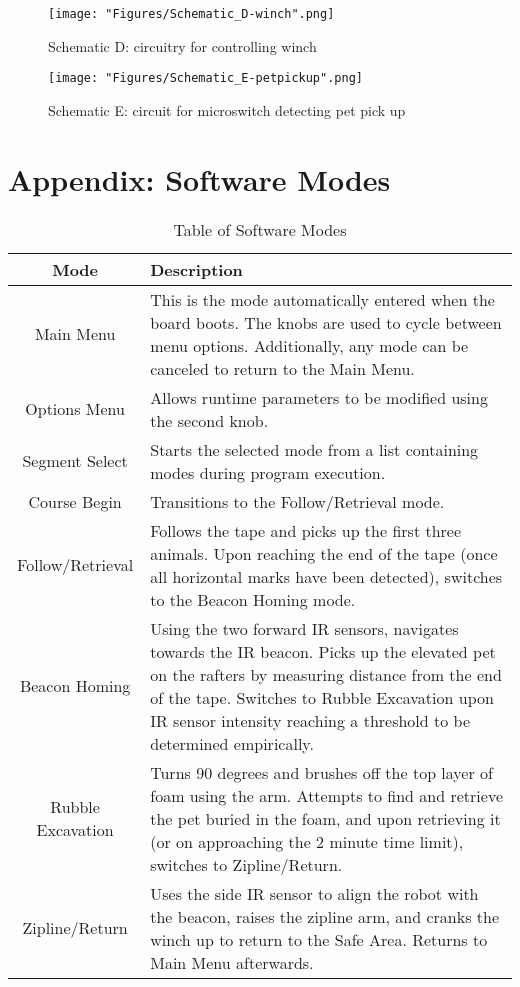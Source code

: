 \newpage
\begin{figure}[ht]
	\centering
	\texttt{[image: "Figures/Schematic\_D-winch".png]}
	\caption*{Schematic D: circuitry for controlling winch}
	\label{sch:D}
\end{figure}

\begin{figure}[ht]
	\centering
	\texttt{[image: "Figures/Schematic\_E-petpickup".png]}
	\caption*{Schematic E: circuit for microswitch detecting pet pick up}
	\label{sch:E}
\end{figure}
\FloatBarrier

\section{Appendix: Software Modes}
\label{AppendixC}

\begin{table}[h]
	\caption{Table of Software Modes}
	\centering
	\begin{tabular}{ | c | p{5in} | }
		\hline
		\textbf{Mode} & \textbf{Description} \\ \hline
		Main Menu & This is the mode automatically entered when the board boots. The knobs are used to cycle between menu options. Additionally, any mode can be canceled to return to the Main Menu. \\ \hline
		Options Menu & Allows runtime parameters to be modified using the second knob. \\ \hline
		Segment Select & Starts the selected mode from a list containing modes during program execution. \\ \hline
		Course Begin & Transitions to the Follow/Retrieval mode. \\ \hline
		Follow/Retrieval & Follows the tape and picks up the first three animals. Upon reaching the end of the tape (once all horizontal marks have been detected), switches to the Beacon Homing mode. \\ \hline
		Beacon Homing & Using the two forward IR sensors, navigates towards the IR beacon. Picks up the elevated pet on the rafters by measuring distance from the end of the tape. Switches to Rubble Excavation upon IR sensor intensity reaching a threshold to be determined empirically. \\ \hline
		Rubble Excavation & Turns 90 degrees and brushes off the top layer of foam using the arm. Attempts to find and retrieve the pet buried in the foam, and upon retrieving it (or on approaching the 2 minute time limit), switches to Zipline/Return. \\ \hline
		Zipline/Return &
		Uses the side IR sensor to align the robot with the beacon, raises the zipline arm, and cranks the winch up to return to the Safe Area. Returns to Main Menu afterwards.
		\\ \hline
	\end{tabular}
	\label{table:Software Modes}
\end{table}
